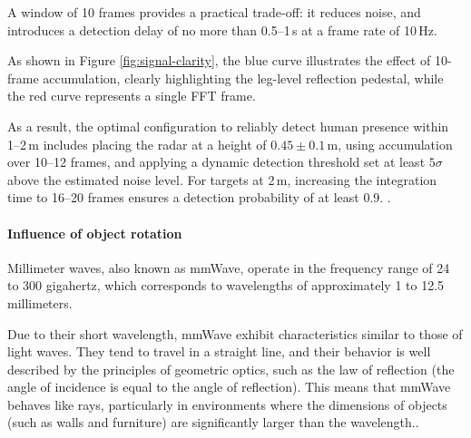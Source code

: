 A window of 10 frames provides a practical trade-off: it reduces noise, and introduces a detection delay of no more than 0.5–1\,s at a frame rate of 10\,Hz.

As shown in Figure \ref{fig:signal-clarity}, the blue curve illustrates the effect of 10-frame accumulation, clearly highlighting the leg-level reflection pedestal, while the red curve represents a single FFT frame.\citep{Skolnik2001} 

As a result, the optimal configuration to reliably detect human presence within 1–2\,m includes placing the radar at a height of \(0.45 \pm 0.1\,\mathrm{m}\), using accumulation over 10–12 frames, and applying a dynamic detection threshold set at least \(5\sigma\) above the estimated noise level. For targets at 2\,m, increasing the integration time to 16–20 frames ensures a detection probability of at least 0.9. .


\paragraph{Influence of object rotation}
Millimeter waves, also known as mmWave, operate in the frequency range of 24 to 300 gigahertz, which corresponds to wavelengths of approximately 1 to 12.5 millimeters.

Due to their short wavelength, mmWave exhibit characteristics similar to those of light waves. They tend to travel in a straight line, and their behavior is well described by the principles of geometric optics, such as the law of reflection (the angle of incidence is equal to the angle of reflection). This means that mmWave behaves like rays, particularly in environments where the dimensions of objects (such as walls and furniture) are significantly larger than the wavelength.\citep{rappaport2002wireless,li2022ground}.

